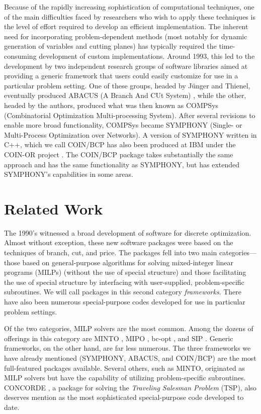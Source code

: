 Because of the rapidly increasing sophistication of computational techniques,
one of the main difficulties faced by researchers who wish to apply these
techniques is the level of effort required to develop an efficient
implementation. The inherent need for incorporating problem-dependent methods
(most notably for dynamic generation of variables and cutting planes) has
typically required the time-consuming development of custom implementations.
Around 1993, this led to the development by two independent research groups of
software libraries aimed at providing a generic framework that users could
easily customize for use in a particular problem setting. One of these groups,
headed by J\"unger and Thienel, eventually produced ABACUS (A Branch And CUt
System) \cite{abacus1}, while the other, headed by the authors, produced what
was then known as COMPSys (Combinatorial Optimization Multi-processing
System). After several revisions to enable more broad functionality, COMPSys
became SYMPHONY (Single- or Multi-Process Optimization over Networks). A
version of SYMPHONY written in C++, which we call COIN/BCP has also been
produced at IBM under the COIN-OR project \cite{coin-or}. The COIN/BCP package
takes substantially the same approach and has the same functionality as
SYMPHONY, but has extended SYMPHONY's capabilities in some areas.

\section{Related Work}
\label{related}

The 1990's witnessed a broad development of software for discrete
optimization. Almost without exception, these new software packages were based
on the techniques of branch, cut, and price. The packages fell into two main
categories---those based on general-purpose algorithms for solving
mixed-integer linear programs (MILPs) (without the use of special structure)
and those facilitating the use of special structure by interfacing with
user-supplied, problem-specific subroutines. We will call packages in this
second category {\em frameworks}. There have also been numerous
special-purpose codes developed for use in particular problem settings.

Of the two categories, MILP solvers are the most common. Among the dozens of
offerings in this category are MINTO \cite{MINTO}, MIPO \cite{MIPO}, bc-opt
\cite{bc-opt}, and SIP \cite{SIP}. Generic frameworks, on the other hand, are
far less numerous. The three frameworks we have already mentioned (SYMPHONY,
ABACUS, and COIN/BCP) are the most full-featured packages available. Several
others, such as MINTO, originated as MILP solvers but have the capability of
utilizing problem-specific subroutines. CONCORDE \cite{concorde, concorde2}, a
package for solving the {\em Traveling Salesman Problem} (TSP), also deserves
mention as the most sophisticated special-purpose code developed to date.

